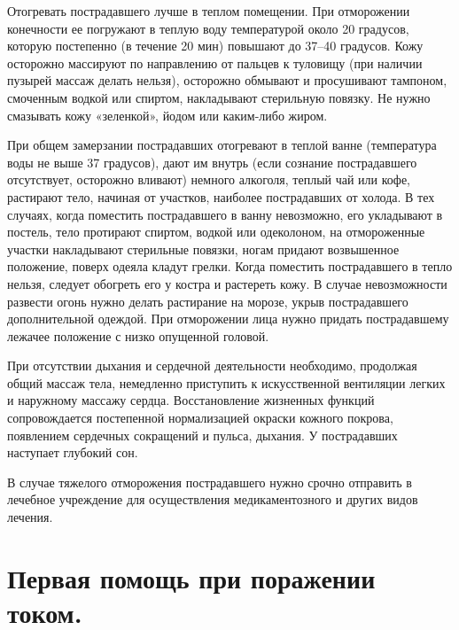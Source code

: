 \documentclass[12pt,a4paper]{report}
\begin{document}
Отогревать пострадавшего лучше в теплом помещении. При отморожении конечности ее погружают в теплую воду температурой около 20 градусов, которую постепенно (в течение 20 мин) повышают до 37–40 градусов. Кожу осторожно массируют по направлению от пальцев к туловищу (при наличии пузырей массаж делать нельзя), осторожно обмывают и просушивают тампоном, смоченным водкой или спиртом, накладывают стерильную повязку. Не нужно смазывать кожу «зеленкой», йодом или каким-либо жиром.

При общем замерзании пострадавших отогревают в теплой ванне (температура воды не выше 37  градусов), дают им внутрь (если сознание пострадавшего отсутствует, осторожно вливают) немного алкоголя, теплый чай или кофе, растирают тело, начиная от участков, наиболее пострадавших от холода. В тех случаях, когда поместить пострадавшего в ванну невозможно, его укладывают в постель, тело протирают спиртом, водкой или одеколоном, на отмороженные участки накладывают стерильные повязки, ногам придают возвышенное положение, поверх одеяла кладут грелки.
Когда поместить пострадавшего в тепло нельзя, следует обогреть его у костра и растереть кожу. В случае невозможности развести огонь нужно делать растирание на морозе, укрыв пострадавшего дополнительной одеждой. При отморожении лица нужно придать пострадавшему лежачее положение с низко опущенной головой.

При отсутствии дыхания и сердечной деятельности необходимо, продолжая общий массаж тела, немедленно приступить к искусственной вентиляции легких и наружному массажу сердца. Восстановление жизненных функций сопровождается постепенной нормализацией окраски кожного покрова, появлением сердечных сокращений и пульса, дыхания. У пострадавших наступает глубокий сон.

В случае тяжелого отморожения пострадавшего нужно срочно отправить в лечебное учреждение для осуществления медикаментозного и других видов лечения.
\newpage
\section{Первая  помощь при поражении током.}
\end{document}
